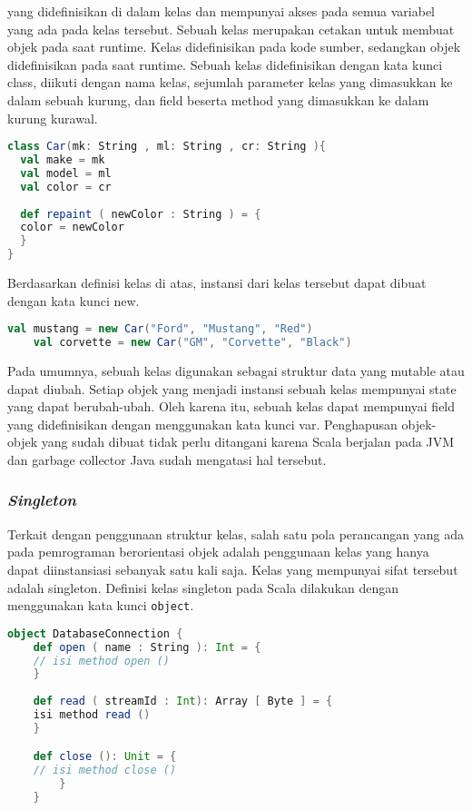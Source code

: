 yang didefinisikan di dalam kelas dan mempunyai akses pada semua variabel yang ada pada kelas
tersebut.
Sebuah kelas merupakan cetakan untuk membuat objek pada saat runtime. Kelas didefinisikan
pada kode sumber, sedangkan objek didefinisikan pada saat runtime. Sebuah kelas didefinisikan
dengan kata kunci class, diikuti dengan nama kelas, sejumlah parameter kelas yang dimasukkan
ke dalam sebuah kurung, dan field beserta method yang dimasukkan ke dalam kurung kurawal.

\begin{lstlisting}[language=Scala, caption=Contoh definisi kelas]
class Car(mk: String , ml: String , cr: String ){
  val make = mk
  val model = ml
  val color = cr
 
  def repaint ( newColor : String ) = {
  color = newColor
  }
}
\end{lstlisting}

Berdasarkan definisi kelas di atas, instansi dari kelas tersebut dapat dibuat dengan kata kunci
new.

\begin{lstlisting}[language=Scala, caption=Pembuatan instansi kelas]
	val mustang = new Car("Ford", "Mustang", "Red")
	val corvette = new Car("GM", "Corvette", "Black")
\end{lstlisting}

Pada umumnya, sebuah kelas digunakan sebagai struktur data yang mutable atau dapat diubah.
Setiap objek yang menjadi instansi sebuah kelas mempunyai state yang dapat berubah-ubah. Oleh
karena itu, sebuah kelas dapat mempunyai field yang didefinisikan dengan menggunakan kata kunci
var. Penghapusan objek-objek yang sudah dibuat tidak perlu ditangani karena Scala berjalan pada
JVM dan garbage collector Java sudah mengatasi hal tersebut.\newline

\subsubsection{\textit{Singleton}}
Terkait dengan penggunaan struktur kelas, salah satu pola perancangan yang ada pada pemrograman
berorientasi objek adalah penggunaan kelas yang hanya dapat diinstansiasi sebanyak satu kali saja.
Kelas yang mempunyai sifat tersebut adalah singleton. Definisi kelas singleton pada Scala dilakukan
dengan menggunakan kata kunci \texttt{object}.
\begin{lstlisting}[language=Scala, caption=Contoh definisi kelas singleton]
	object DatabaseConnection {
	def open ( name : String ): Int = {
	// isi method open ()
	}
	
	def read ( streamId : Int): Array [ Byte ] = {
	isi method read ()
	}

	def close (): Unit = {
	// isi method close ()
		}
	}
\end{lstlisting}

